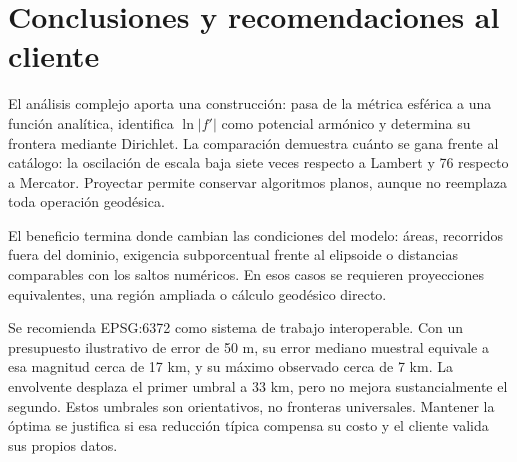 \section{Conclusiones y recomendaciones al cliente}
El análisis complejo aporta una construcción: pasa de la métrica esférica a una función analítica, identifica $\ln|f'|$ como potencial armónico y determina su frontera mediante Dirichlet. La comparación demuestra cuánto se gana frente al catálogo: la oscilación de escala baja siete veces respecto a Lambert y 76 respecto a Mercator. Proyectar permite conservar algoritmos planos, aunque no reemplaza toda operación geodésica.

El beneficio termina donde cambian las condiciones del modelo: áreas, recorridos fuera del dominio, exigencia subporcentual frente al elipsoide o distancias comparables con los saltos numéricos. En esos casos se requieren proyecciones equivalentes, una región ampliada o cálculo geodésico directo.

Se recomienda EPSG:6372 como sistema de trabajo interoperable. Con un presupuesto ilustrativo de error de 50 m, su error mediano muestral equivale a esa magnitud cerca de 17 km, y su máximo observado cerca de 7 km. La envolvente desplaza el primer umbral a 33 km, pero no mejora sustancialmente el segundo. Estos umbrales son orientativos, no fronteras universales. Mantener la óptima se justifica si esa reducción típica compensa su costo y el cliente valida sus propios datos.
